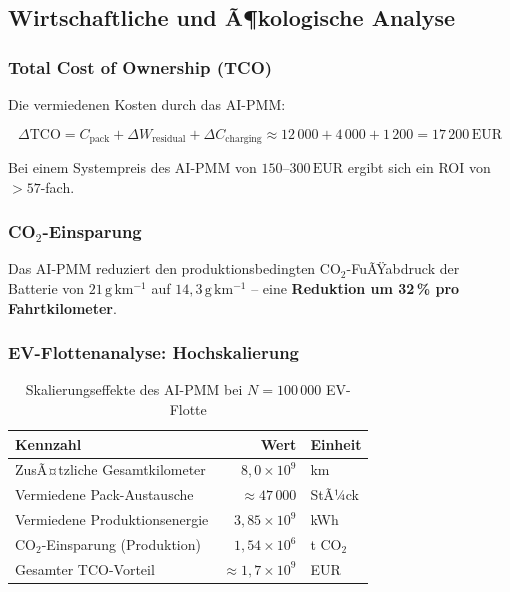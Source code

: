 ﻿\documentclass[12pt,a4paper]{article}
\begin{document}
	\subsection{Wirtschaftliche und Ã¶kologische Analyse}
	
	\subsubsection{Total Cost of Ownership (TCO)}
	
	Die vermiedenen Kosten durch das AI-PMM:
	
	\begin{equation}
		\Delta\mathrm{TCO} = C_\mathrm{pack} + \Delta W_\mathrm{residual}
		+ \Delta C_\mathrm{charging}
		\approx 12\,000 + 4\,000 + 1\,200 = 17\,200\,\text{EUR}
		\label{eq:tco}
	\end{equation}
	
	Bei einem Systempreis des AI-PMM von $150\text{--}300\,\text{EUR}$ ergibt
	sich ein ROI von $> 57$-fach.
	
	\subsubsection{CO$_2$-Einsparung}
	
	Das AI-PMM reduziert den produktionsbedingten CO$_2$-FuÃŸabdruck der Batterie
	von $21\,\mathrm{g\,km^{-1}}$ auf $14{,}3\,\mathrm{g\,km^{-1}}$ -- eine
	\textbf{Reduktion um 32\,\% pro Fahrtkilometer}.
	
	\subsubsection{EV-Flottenanalyse: Hochskalierung}
	
	\begin{table}[H]
		\centering
		\caption{Skalierungseffekte des AI-PMM bei $N = 100\,000$ EV-Flotte}
		\label{tab:fleet}
		\begin{tabular}{lrl}
			\toprule
			\textbf{Kennzahl} & \textbf{Wert} & \textbf{Einheit} \\
			\midrule
			ZusÃ¤tzliche Gesamtkilometer & $8{,}0 \times 10^9$ & km \\
			Vermiedene Pack-Austausche & $\approx 47\,000$ & StÃ¼ck \\
			Vermiedene Produktionsenergie & $3{,}85 \times 10^9$ & kWh \\
			CO$_2$-Einsparung (Produktion) & $1{,}54 \times 10^6$ & t CO$_2$ \\
			Gesamter TCO-Vorteil & $\approx 1{,}7 \times 10^9$ & EUR \\
			\bottomrule
		\end{tabular}
	\end{table}
	
\end{document}
